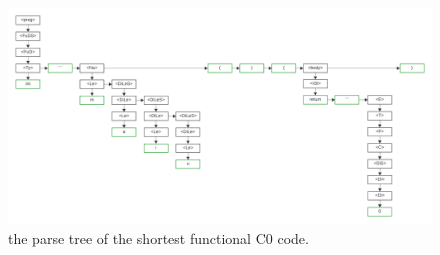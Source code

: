 \begin{figure}[h!]
    \includegraphics[width=\linewidth]{parseTree.png}
    \caption{the parse tree of the shortest functional C0 code.}
    \label{5}
\end{figure}
